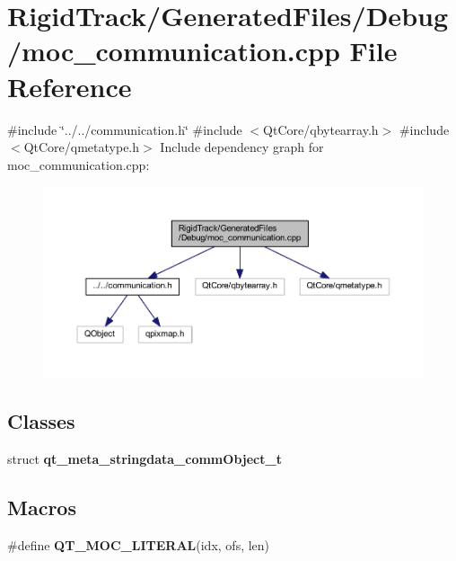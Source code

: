 \section{Rigid\+Track/\+Generated\+Files/\+Debug/moc\+\_\+communication.cpp File Reference}
\label{_debug_2moc__communication_8cpp}
{\ttfamily \#include \char`\"{}../../communication.\+h\char`\"{}}\newline
{\ttfamily \#include $<$Qt\+Core/qbytearray.\+h$>$}\newline
{\ttfamily \#include $<$Qt\+Core/qmetatype.\+h$>$}\newline
Include dependency graph for moc\+\_\+communication.\+cpp\+:\nopagebreak
\begin{figure}[H]
\begin{center}
\leavevmode
\includegraphics[width=350pt]{_debug_2moc__communication_8cpp__incl}
\end{center}
\end{figure}
\subsection*{Classes}
\begin{DoxyCompactItemize}
\item 
struct \textbf{ qt\+\_\+meta\+\_\+stringdata\+\_\+comm\+Object\+\_\+t}
\end{DoxyCompactItemize}
\subsection*{Macros}
\begin{DoxyCompactItemize}
\item 
\#define \textbf{ Q\+T\+\_\+\+M\+O\+C\+\_\+\+L\+I\+T\+E\+R\+AL}(idx,  ofs,  len)
\end{DoxyCompactItemize}


